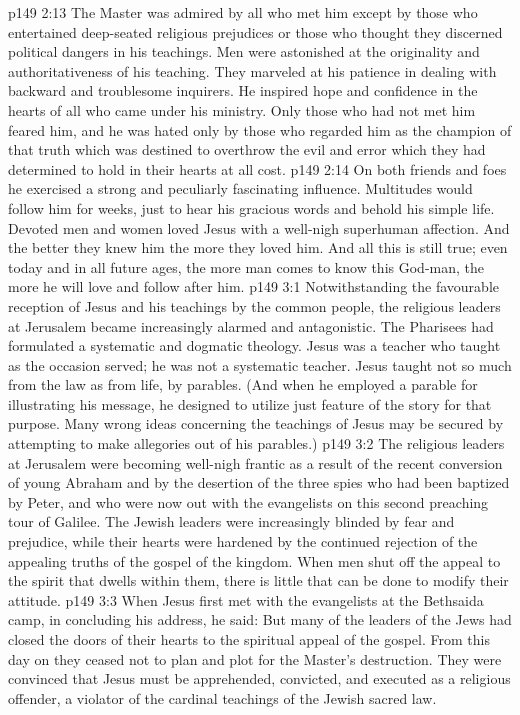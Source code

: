 \vs p149 2:13 The Master was admired by all who met him except by those who entertained deep\hyp{}seated religious prejudices or those who thought they discerned political dangers in his teachings. Men were astonished at the originality and authoritativeness of his teaching. They marveled at his patience in dealing with backward and troublesome inquirers. He inspired hope and confidence in the hearts of all who came under his ministry. Only those who had not met him feared him, and he was hated only by those who regarded him as the champion of that truth which was destined to overthrow the evil and error which they had determined to hold in their hearts at all cost.
\vs p149 2:14 On both friends and foes he exercised a strong and peculiarly fascinating influence. Multitudes would follow him for weeks, just to hear his gracious words and behold his simple life. Devoted men and women loved Jesus with a well\hyp{}nigh superhuman affection. And the better they knew him the more they loved him. And all this is still true; even today and in all future ages, the more man comes to know this God\hyp{}man, the more he will love and follow after him.
\vs p149 3:1 Notwithstanding the favourable reception of Jesus and his teachings by the common people, the religious leaders at Jerusalem became increasingly alarmed and antagonistic. The Pharisees had formulated a systematic and dogmatic theology. Jesus was a teacher who taught as the occasion served; he was not a systematic teacher. Jesus taught not so much from the law as from life, by parables. (And when he employed a parable for illustrating his message, he designed to utilize just  feature of the story for that purpose. Many wrong ideas concerning the teachings of Jesus may be secured by attempting to make allegories out of his parables.)
\vs p149 3:2 The religious leaders at Jerusalem were becoming well\hyp{}nigh frantic as a result of the recent conversion of young Abraham and by the desertion of the three spies who had been baptized by Peter, and who were now out with the evangelists on this second preaching tour of Galilee. The Jewish leaders were increasingly blinded by fear and prejudice, while their hearts were hardened by the continued rejection of the appealing truths of the gospel of the kingdom. When men shut off the appeal to the spirit that dwells within them, there is little that can be done to modify their attitude.
\vs p149 3:3 When Jesus first met with the evangelists at the Bethsaida camp, in concluding his address, he said:  But many of the leaders of the Jews had closed the doors of their hearts to the spiritual appeal of the gospel. From this day on they ceased not to plan and plot for the Master’s destruction. They were convinced that Jesus must be apprehended, convicted, and executed as a religious offender, a violator of the cardinal teachings of the Jewish sacred law.
